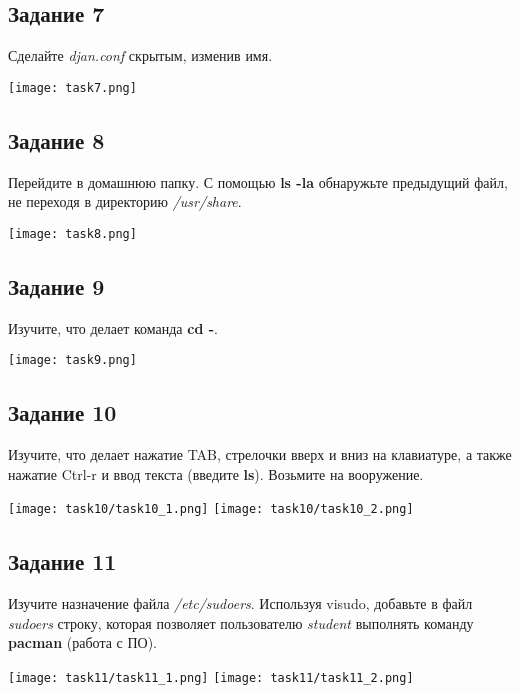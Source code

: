 \documentclass[12pt, a4paper]{report}
\begin{document}
			\subsection*{Задание 7}
			Сделайте \textit{djan.conf} скрытым, изменив имя.
			\lstset{style=mystyle}
			
			\begin{center}
				\texttt{[image: task7.png]}
			\end{center}
	
			\subsection*{Задание 8}
			Перейдите в домашнюю папку. С помощью \textbf{ls -la} обнаружьте предыдущий файл, не переходя в директорию \textit{/usr/share}.
			\lstset{style=mystyle}
			
			\begin{center}
				\texttt{[image: task8.png]}
			\end{center}
	
			\subsection*{Задание 9}
			Изучите, что делает команда \textbf{cd -}.
			\lstset{style=mystyle}
			
			\begin{center}
				\texttt{[image: task9.png]}
			\end{center}
	
			\subsection*{Задание 10}
			Изучите, что делает нажатие TAB, стрелочки вверх и вниз на клавиатуре, а также нажатие Ctrl-r и ввод текста (введите \textbf{ls}). Возьмите на вооружение.
			\begin{center}
				\texttt{[image: task10/task10\_1.png]}
				\texttt{[image: task10/task10\_2.png]}
			\end{center}
			\subsection*{Задание 11}
			Изучите назначение файла \textit{/etc/sudoers}. Используя visudo, добавьте в файл \textit{sudoers} строку, которая позволяет пользователю \textit{student} выполнять команду \textbf{pacman} (работа с ПО).
			\begin{center}
				\texttt{[image: task11/task11\_1.png]}
				\texttt{[image: task11/task11\_2.png]}
			\end{center}
	
\end{document}
